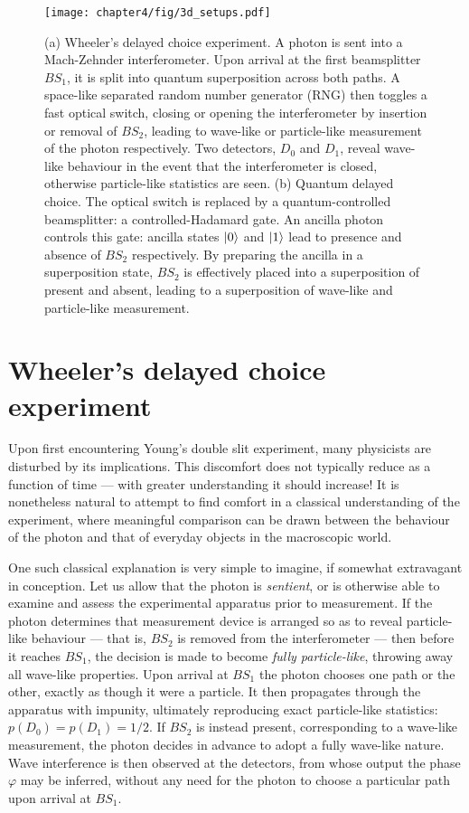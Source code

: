 \begin{figure}[t]
\centering
\texttt{[image: chapter4/fig/3d\_setups.pdf]}
\caption[Wheeler's (quantum) delayed choice experiment]{
(a) Wheeler's delayed choice experiment. A photon is sent into a Mach-Zehnder interferometer. Upon arrival at the first beamsplitter $BS_1$, it is split into quantum superposition across both paths. A space-like separated random number generator (RNG) then toggles a fast optical switch, closing or opening the interferometer by insertion or removal of $BS_2$, leading to wave-like or particle-like measurement of the photon respectively. Two detectors, $D_0$ and $D_1$, reveal wave-like behaviour in the event that the interferometer is closed, otherwise particle-like statistics are seen.
(b) Quantum delayed choice. The optical switch is replaced by a quantum-controlled beamsplitter: a controlled-Hadamard gate. An ancilla photon controls this gate: ancilla states $\mbox{$ | 0 \rangle $}$ and $\mbox{$ | 1 \rangle $}$ lead to presence and absence of $BS_2$ respectively. By preparing the ancilla in a superposition state, $BS_2$ is effectively placed into a superposition of present and absent, leading to a superposition of wave-like and particle-like measurement.
}
\label{fig:delayed-choice-setups}
\end{figure}

\section{Wheeler's delayed choice experiment}
Upon first encountering Young's double slit experiment, many physicists are disturbed by its implications. This discomfort does not typically reduce as a function of time --- with greater understanding it should increase! It is nonetheless natural to attempt to find comfort in a classical understanding of the experiment, where meaningful comparison can be drawn between the behaviour of the photon and that of everyday objects in the macroscopic world.

One such classical explanation is very simple to imagine, if somewhat extravagant in conception. Let us allow that the photon is \emph{sentient}, or is otherwise able to examine and assess the experimental apparatus prior to measurement. 
If the photon determines that measurement device is arranged so as to reveal particle-like behaviour --- that is, $BS_2$ is removed from the interferometer --- then before it reaches $BS_1$, the decision is made to become \emph{fully particle-like}, throwing away all wave-like properties. Upon arrival at $BS_1$ the photon chooses one path or the other, exactly as though it were a particle.  It then propagates through the apparatus with impunity, ultimately reproducing exact particle-like statistics: $p(D_0)=p(D_1)=1/2$. If $BS_2$ is instead present, corresponding to a wave-like measurement, the photon decides in advance to adopt a fully wave-like nature. Wave interference is then observed at the detectors, from whose output the phase $\varphi$ may be inferred, without any need for the photon to choose a particular path upon arrival at $BS_1$. 

